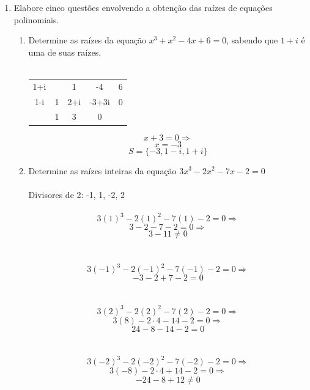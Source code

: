 \documentclass[a4paper, 12pt]{article}
\begin{document}
\begin{enumerate}
\item Elabore cinco questões envolvendo a obtenção das raízes de equações polinomiais.\\
  \begin{enumerate}
  \item Determine as raízes da equação $x^{3}+x^2-4x+6=0$, sabendo que $1+i$ é uma de suas raízes. \\\\
    \centering
    \begin{tabular}{c c c c c}
    1+i & \textbar 1 & 1 & -4 & 6 \\
    1-i & 1 & 2+i & -3+3i & 0 \\
    &  1 & 3 & 0
    \end{tabular}
    $$ x + 3 = 0 \Rightarrow $$
    $$ x = -3 $$
    $$ \boxed{S=\{-3, 1-i, 1+i\}}$$

  \item Determine as raízes inteiras da equação $3x^3-2x^2-7x-2=0$ \\\\
    Divisores de 2: -1, 1, -2, 2\\\\
    $$3(1)^3-2(1)^2-7(1)-2=0 \Rightarrow $$
    $$3-2-7-2=0 \Rightarrow $$
    $$3-11 \ne 0$$\\\\
    
    $$3(-1)^3-2(-1)^2-7(-1)-2=0 \Rightarrow $$
    $$-3-2+7-2=0 $$\\\\

    $$3(2)^3-2(2)^2-7(2)-2=0 \Rightarrow $$
    $$3(8)-2\cdot4-14-2=0 \Rightarrow $$
    $$24-8-14-2 = 0$$\\\\

    $$3(-2)^3-2(-2)^2-7(-2)-2=0 \Rightarrow $$
    $$3(-8)-2\cdot4+14-2=0 \Rightarrow $$
    $$-24-8+12 \ne 0$$


\end{enumerate}
\end{enumerate}
\end{document}
